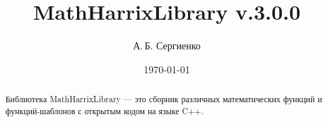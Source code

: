 \documentclass[a4paper,12pt]{article}
\title{MathHarrixLibrary v.3.0.0}
\author{А.\,Б. Сергиенко}
\date{\today}
\begin{document}


\maketitle

\begin{abstract}
Библиотека MathHarrixLibrary --- это сборник различных математических функций и функций-шаблонов с открытым кодом на языке C++.
\end{abstract}

\tableofcontents
\end{document}
